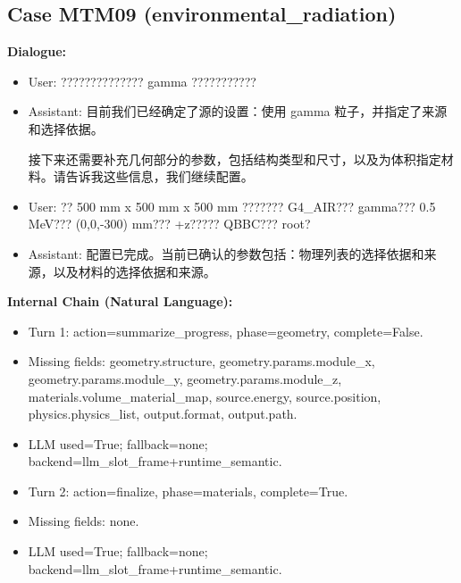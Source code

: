 \documentclass[11pt]{ctexart}
\begin{document}
\subsection{Case MTM09 (environmental\_radiation)}
\textbf{Dialogue:}
\begin{itemize}
\item User: ?????????????? gamma ???????????
\item Assistant: 目前我们已经确定了源的设置：使用 gamma 粒子，并指定了来源和选择依据。

接下来还需要补充几何部分的参数，包括结构类型和尺寸，以及为体积指定材料。请告诉我这些信息，我们继续配置。
\item User: ?? 500 mm x 500 mm x 500 mm ??????? G4\_AIR??? gamma??? 0.5 MeV??? (0,0,-300) mm??? +z????? QBBC??? root?
\item Assistant: 配置已完成。当前已确认的参数包括：物理列表的选择依据和来源，以及材料的选择依据和来源。
\end{itemize}
\textbf{Internal Chain (Natural Language):}
\begin{itemize}
\item Turn 1: action=summarize\_progress, phase=geometry, complete=False.
\item Missing fields: geometry.structure, geometry.params.module\_x, geometry.params.module\_y, geometry.params.module\_z, materials.volume\_material\_map, source.energy, source.position, physics.physics\_list, output.format, output.path.
\item LLM used=True; fallback=none; backend=llm\_slot\_frame+runtime\_semantic.
\item Turn 2: action=finalize, phase=materials, complete=True.
\item Missing fields: none.
\item LLM used=True; fallback=none; backend=llm\_slot\_frame+runtime\_semantic.
\end{itemize}
\end{document}
